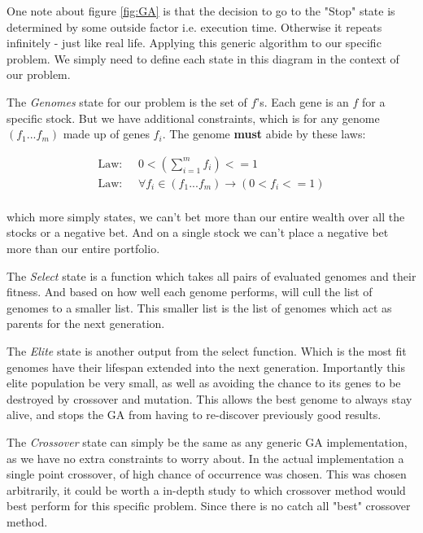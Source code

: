 \documentclass[11pt]{article}
\begin{document}
    One note about figure \ref{fig:GA} is that the decision to go to the "Stop"
    state is determined by some outside factor i.e. execution time. Otherwise
    it repeats infinitely - just like real life. Applying this generic algorithm to 
    our specific problem. We simply need to
    define each state in this diagram in the context of our problem.

    The \textit{Genomes} state for our problem is the set of \(f\)'s. Each gene is an
    \(f\) for a specific stock. But we have additional constraints, which is for 
    any genome \((f_1...f_m)\) made up of genes \(f_i\). The genome \textbf{must}
    abide by these laws:

    \begin{align*}
        \text{Law: } & \;
        0 < \left(
            \displaystyle\sum^{m}_{i=1} f_i
        \right) <= 1 \\
        \text{Law: } & \;
        \forall f_i \in (f_1...f_m) \to \left(
            0 < f_i <= 1
        \right) \\
    \end{align*}

    which more simply states, we can't bet more than our entire wealth over all the stocks or
    a negative bet. And on a single stock we can't place a negative bet more than our
    entire portfolio.

    The \textit{Select} state is a function which takes all pairs of evaluated genomes
    and their fitness. And based on how well each genome performs, will cull the
    list of genomes to a smaller list. This smaller list is the list of genomes
    which act as parents for the next generation.

    The \textit{Elite} state is another output from the select function. Which is
    the most fit genomes have their lifespan extended into the next generation.
    Importantly this elite population be very small, as well as avoiding the
    chance to its genes to be destroyed by crossover and mutation. \cite{DeJong}
    This allows the best genome to always stay alive, and stops the GA from
    having to re-discover previously good results.

    The \textit{Crossover} state can simply be the same as any generic GA implementation,
    as we have no extra constraints to worry about. In the actual implementation
    a single point crossover, of high chance of occurrence was chosen. This was
    chosen arbitrarily, it could be worth a in-depth study to which crossover
    method would best perform for this specific problem. Since there is no catch all
    "best" crossover method.
\end{document}
